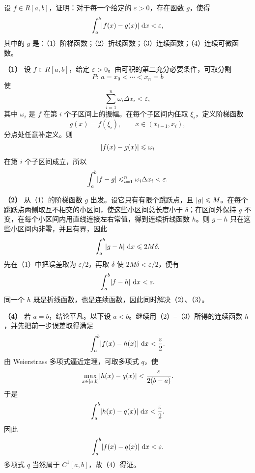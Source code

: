 \begin{xreferenceproblem}[5]
设 $f\in R[a,b]$，证明：对于每一个给定的 $\varepsilon>0$，存在函数 $g$，使得
\[
  \int_a^b\lvert f(x)-g(x)\rvert\,\mathop{}\!\mathrm{d} x<\varepsilon,
\]
其中的 $g$ 是：（1）阶梯函数；（2）折线函数；（3）连续函数；（4）连续可微函数。
\end{xreferenceproblem}
\begin{xsolution}
\textbf{（1）}\quad
设 $f\in R[a,b]$，给定 $\varepsilon>0$。由可积的第二充分必要条件，可取分割
\[
  P:\ a=x_0<\cdots<x_n=b
\]
使
\[
  \sum_{i=1}^n\omega_i\Delta x_i<\varepsilon,
\]
其中 $\omega_i$ 是 $f$ 在第 $i$ 个子区间上的振幅。在每个子区间内任取 $\xi_i$，定义阶梯函数
\[
  g(x)=f(\xi_i),\qquad x\in(x_{i-1},x_i),
\]
分点处任意补定义。则
\[
  \lvert f(x)-g(x)\rvert\leqslant\omega_i
\]
在第 $i$ 个子区间成立，所以
\[
  \int_a^b\lvert f-g\rvert\leqslant
  \relax_{i=1}^n\omega_i\Delta x_i<\varepsilon.
\]

\textbf{（2）}\quad
从（1）的阶梯函数 $g$ 出发。设它只有有限个跳跃点，且 $\lvert g\rvert\leqslant M$。在每个跳跃点两侧取互不相交的小区间，使这些小区间总长度小于 $\delta$；在区间外保持 $g$ 不变，在每个小区间内用直线连接左右常值，得到连续折线函数 $h$。则 $g-h$ 只在这些小区间内非零，并且有界，因此
\[
  \int_a^b\lvert g-h\rvert\,\mathop{}\!\mathrm{d} x\leqslant 2M\delta.
\]
先在（1）中把误差取为 $\varepsilon/2$，再取 $\delta$ 使 $2M\delta<\varepsilon/2$，便有
\[
  \int_a^b\lvert f-h\rvert\,\mathop{}\!\mathrm{d} x<\varepsilon.
\]
同一个 $h$ 既是折线函数，也是连续函数，因此同时解决（2）、（3）。

\textbf{（4）}\quad
若 $a=b$，结论平凡。以下设 $a<b$。继续用（2）--（3）所得的连续函数 $h$，并先把前一步误差取得满足
\[
  \int_a^b\lvert f(x)-h(x)\rvert\,\mathop{}\!\mathrm{d} x<\frac\varepsilon2.
\]
由 Weierstrass 多项式逼近定理，可取多项式 $q$，使
\[
  \max_{x\in[a,b]}\lvert h(x)-q(x)\rvert
  <\frac{\varepsilon}{2(b-a)}.
\]
于是
\[
  \int_a^b\lvert h(x)-q(x)\rvert\,\mathop{}\!\mathrm{d} x<\frac\varepsilon2.
\]
因此
\[
  \int_a^b\lvert f(x)-q(x)\rvert\,\mathop{}\!\mathrm{d} x<\varepsilon.
\]
多项式 $q$ 当然属于 $C^1[a,b]$，故（4）得证。
\end{xsolution}


